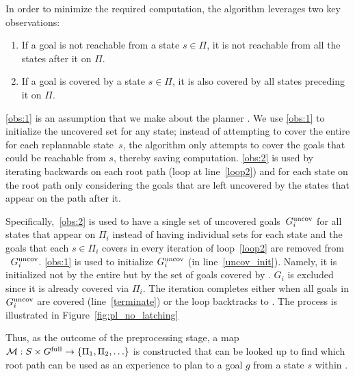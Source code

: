 \documentclass[a4paper]{report}
\begin{document}
In order to minimize the required computation, the algorithm leverages two key observations:

\begin{enumerate}[label={\textbf{O\arabic*}},leftmargin=0.75cm]
    \item \label{obs:1}
    If a goal is not reachable from a state $s \in \Pi$, it is not reachable from all the states after it on $\Pi$.
    \item \label{obs:2}
    If a goal is covered by a state $s \in \Pi$, it is also covered by all states preceding it on $\Pi$.
\end{enumerate}

\ref{obs:1} is an assumption that we make about the planner \calP. We use \ref{obs:1} to initialize the uncovered set for any state; instead of attempting to cover the entire \Gfull for each replannable state~$s$, the algorithm only attempts to cover the goals that could be reachable from $s$, thereby saving computation.
%
\ref{obs:2} is used by iterating backwards on each root path (loop at line~\ref{loop2}) and for each state on the root path only considering the goals that are left uncovered by the states that appear on the path after it.

Specifically,~\ref{obs:2} is used to have a single set of uncovered goals~$G^{\textrm{uncov}}_i$ for all states that appear on $\Pi_i$ instead of having individual sets for each state and the goals that each $s \in \Pi_i$ covers in every iteration of loop~\ref{loop2} are removed from ~$G^{\textrm{uncov}}_i$.
%
\ref{obs:1} is used to initialize $G^{\textrm{uncov}}_i$ (in line~\ref{uncov_init}). Namely, it is initialized not by the entire \Gfull but by the set of goals covered by \Sstart. $G_i$ is excluded since it is already covered via $\Pi_i$. The iteration completes either when all goals in $G^{\textrm{uncov}}_i$ are covered (line~\ref{terminate}) or the loop backtracks to \Sstart.
The process is illustrated in Figure~\ref{fig:pl_no_latching}

Thus, as the outcome of the preprocessing stage, a map $\mathcal{M}: S \times G^{\textrm{full}} \rightarrow \{ \Pi_1, \Pi_2, \ldots \}$ is constructed that can be looked up to find which root path can be used as an experience to plan to a goal $g$ from a state $s$ within \Tbound.
\end{document}
